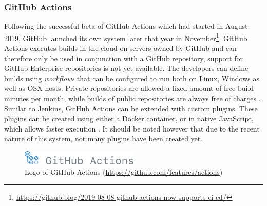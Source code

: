 
\subsubsection{GitHub Actions}
Following the successful beta of GitHub Actions which had started in August 2019, GitHub launched its own \CI{} system later that year in November\footnote{\url{https://github.blog/2019-08-08-github-actions-now-supports-ci-cd/}}. GitHub Actions executes builds in the cloud on servers owned by GitHub and can therefore only be used in conjunction with a GitHub repository, support for GitHub Enterprise repositories is not yet available. The developers can define builds using \emph{workflows} that can be configured to run both on Linux, Windows as well as OSX hosts. Private repositories are allowed a fixed amount of free build minutes per month, while builds of public repositories are always free of charges \cite{githubactions}. Similar to Jenkins, GitHub Actions can be extended with custom plugins. These plugins can be created using either a Docker container, or in native JavaScript, which allows faster execution \cite{aboutgithubactions}. It should be noted however that due to the recent nature of this system, not many plugins have been created yet.

\begin{figure}[htbp!]
	\centering
	\includegraphics[width=0.5\textwidth]{assets/images/github-actions.pdf}
	\caption{Logo of GitHub Actions (\url{https://github.com/features/actions})}
	\label{fig:github-actions}
\end{figure}